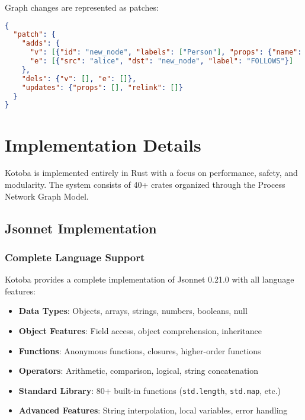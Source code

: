 \documentclass[11pt,a4paper]{article}
\begin{document}
Graph changes are represented as patches:

\begin{lstlisting}[language=json,caption=Patch-IR example]
{
  "patch": {
    "adds": {
      "v": [{"id": "new_node", "labels": ["Person"], "props": {"name": "Charlie"}}],
      "e": [{"src": "alice", "dst": "new_node", "label": "FOLLOWS"}]
    },
    "dels": {"v": [], "e": []},
    "updates": {"props": [], "relink": []}
  }
}
\end{lstlisting}

\section{Implementation Details}
\label{sec:implementation}

Kotoba is implemented entirely in Rust with a focus on performance, safety, and modularity. The system consists of 40+ crates organized through the Process Network Graph Model.

\subsection{Jsonnet Implementation}
\label{subsec:jsonnet_impl}

\subsubsection{Complete Language Support}
\label{subsubsec:jsonnet_features}

Kotoba provides a complete implementation of Jsonnet 0.21.0 with all language features:

\begin{itemize}
\item \textbf{Data Types}: Objects, arrays, strings, numbers, booleans, null
\item \textbf{Object Features}: Field access, object comprehension, inheritance
\item \textbf{Functions}: Anonymous functions, closures, higher-order functions
\item \textbf{Operators}: Arithmetic, comparison, logical, string concatenation
\item \textbf{Standard Library}: 80+ built-in functions (\texttt{std.length}, \texttt{std.map}, etc.)
\item \textbf{Advanced Features}: String interpolation, local variables, error handling
\end{itemize}
\end{document}
